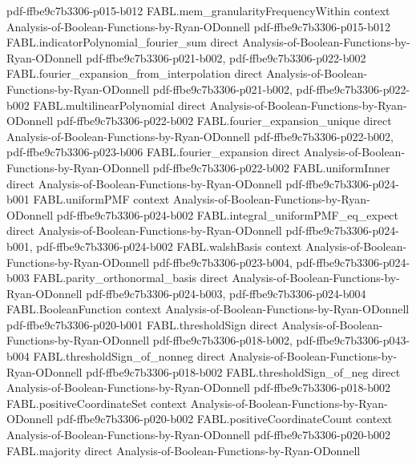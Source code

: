 \begin{theorem}
  {pdf-ffbe9c7b3306-p015-b012}
\proofstep
  {FABL.mem_granularityFrequencyWithin}
  {context}
  {Analysis-of-Boolean-Functions-by-Ryan-ODonnell}
  {pdf-ffbe9c7b3306-p015-b012}
\proofstep
  {FABL.indicatorPolynomial_fourier_sum}
  {direct}
  {Analysis-of-Boolean-Functions-by-Ryan-ODonnell}
  {pdf-ffbe9c7b3306-p021-b002,
    pdf-ffbe9c7b3306-p022-b002}
\proofstep
  {FABL.fourier_expansion_from_interpolation}
  {direct}
  {Analysis-of-Boolean-Functions-by-Ryan-ODonnell}
  {pdf-ffbe9c7b3306-p021-b002,
    pdf-ffbe9c7b3306-p022-b002}
\proofstep
  {FABL.multilinearPolynomial}
  {direct}
  {Analysis-of-Boolean-Functions-by-Ryan-ODonnell}
  {pdf-ffbe9c7b3306-p022-b002}
\proofstep
  {FABL.fourier_expansion_unique}
  {direct}
  {Analysis-of-Boolean-Functions-by-Ryan-ODonnell}
  {pdf-ffbe9c7b3306-p022-b002,
    pdf-ffbe9c7b3306-p023-b006}
\proofstep
  {FABL.fourier_expansion}
  {direct}
  {Analysis-of-Boolean-Functions-by-Ryan-ODonnell}
  {pdf-ffbe9c7b3306-p022-b002}
\proofstep
  {FABL.uniformInner}
  {direct}
  {Analysis-of-Boolean-Functions-by-Ryan-ODonnell}
  {pdf-ffbe9c7b3306-p024-b001}
\proofstep
  {FABL.uniformPMF}
  {context}
  {Analysis-of-Boolean-Functions-by-Ryan-ODonnell}
  {pdf-ffbe9c7b3306-p024-b002}
\proofstep
  {FABL.integral_uniformPMF_eq_expect}
  {direct}
  {Analysis-of-Boolean-Functions-by-Ryan-ODonnell}
  {pdf-ffbe9c7b3306-p024-b001,
    pdf-ffbe9c7b3306-p024-b002}
\proofstep
  {FABL.walshBasis}
  {context}
  {Analysis-of-Boolean-Functions-by-Ryan-ODonnell}
  {pdf-ffbe9c7b3306-p023-b004,
    pdf-ffbe9c7b3306-p024-b003}
\proofstep
  {FABL.parity_orthonormal_basis}
  {direct}
  {Analysis-of-Boolean-Functions-by-Ryan-ODonnell}
  {pdf-ffbe9c7b3306-p024-b003,
    pdf-ffbe9c7b3306-p024-b004}
\proofstep
  {FABL.BooleanFunction}
  {context}
  {Analysis-of-Boolean-Functions-by-Ryan-ODonnell}
  {pdf-ffbe9c7b3306-p020-b001}
\proofstep
  {FABL.thresholdSign}
  {direct}
  {Analysis-of-Boolean-Functions-by-Ryan-ODonnell}
  {pdf-ffbe9c7b3306-p018-b002,
    pdf-ffbe9c7b3306-p043-b004}
\proofstep
  {FABL.thresholdSign_of_nonneg}
  {direct}
  {Analysis-of-Boolean-Functions-by-Ryan-ODonnell}
  {pdf-ffbe9c7b3306-p018-b002}
\proofstep
  {FABL.thresholdSign_of_neg}
  {direct}
  {Analysis-of-Boolean-Functions-by-Ryan-ODonnell}
  {pdf-ffbe9c7b3306-p018-b002}
\proofstep
  {FABL.positiveCoordinateSet}
  {context}
  {Analysis-of-Boolean-Functions-by-Ryan-ODonnell}
  {pdf-ffbe9c7b3306-p020-b002}
\proofstep
  {FABL.positiveCoordinateCount}
  {context}
  {Analysis-of-Boolean-Functions-by-Ryan-ODonnell}
  {pdf-ffbe9c7b3306-p020-b002}
\proofstep
  {FABL.majority}
  {direct}
  {Analysis-of-Boolean-Functions-by-Ryan-ODonnell}

\end{theorem}

